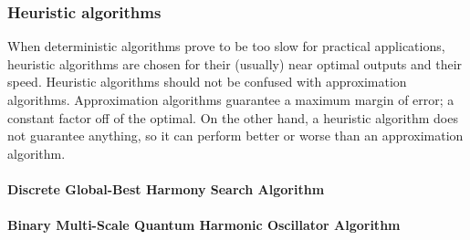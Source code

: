 \documentclass[titlepage]{article}
\begin{document}
\subsubsection*{Heuristic algorithms}
When deterministic algorithms prove to be too slow for practical applications, heuristic algorithms are chosen for their (usually) near optimal outputs and their speed. Heuristic algorithms should not be confused with approximation algorithms. Approximation algorithms guarantee a maximum margin of error; a constant factor off of the optimal. On the other hand, a heuristic algorithm does not guarantee anything, so it can perform better or worse than an approximation algorithm. 

\paragraph*{Discrete Global-Best Harmony Search Algorithm}
\paragraph*{Binary Multi-Scale Quantum Harmonic Oscillator Algorithm}






 
\end{document}
